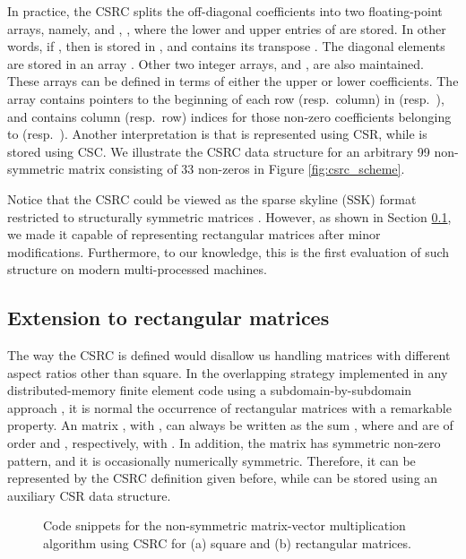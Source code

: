 \documentclass[11pt]{article}
\begin{document}
In practice, the CSRC splits the off-diagonal coefficients into two
floating-point arrays, namely,  and , ,
where the lower and upper entries of  are stored.  In other words, if , then  is stored in , and  contains its transpose .
The diagonal elements are stored in an array .  Other two integer
arrays,  and , are also maintained. These arrays can be defined
in terms of either the upper or lower coefficients.  The  array
contains pointers to the beginning of each row (resp.~column) in 
(resp.~), and  contains column (resp.~row) indices for those non-zero
coefficients belonging to  (resp.~).  Another
interpretation is that  is represented using CSR, while  is stored using
CSC.  We illustrate the CSRC data structure for an arbitrary 99 non-symmetric matrix
consisting of 33 non-zeros in Figure \ref{fig:csrc_scheme}.

Notice that the CSRC could be viewed as the sparse skyline (SSK) format
restricted to structurally symmetric matrices \cite{Saa95a,GR01a}.
However, as shown in Section \ref{sec:rectextension}, we made it capable of
representing rectangular matrices after minor modifications.  Furthermore, to
our knowledge, this is the first evaluation of such structure on modern
multi-processed machines.

\subsection{Extension to rectangular matrices}
\label{sec:rectextension}

The way the CSRC is defined would disallow us handling matrices with different
aspect ratios other than square.  In the overlapping strategy
implemented in any distributed-memory finite element code using a 
subdomain-by-subdomain approach
\cite{RF07a,ARM09a}, it is normal the
occurrence of rectangular matrices with a remarkable property.
An  matrix ,
with , can always be written as the sum , where
 and  are of order  and , respectively, with
.  In addition, the  matrix has symmetric non-zero pattern, and
it is occasionally numerically symmetric.  Therefore, it can be represented by the
CSRC definition given before, while  can be stored using an auxiliary CSR
data structure.

\begin{figure}[!t]
\centering
\subfloat[]{\label{fig:matvec_csrc}}
\hfil
\subfloat[]{\label{fig:matvec_csrcr}}
\caption{Code snippets for the non-symmetric matrix-vector multiplication
algorithm using CSRC for (a) square and
(b) rectangular matrices.}
\label{fig:SpMV}
\end{figure}
\end{document}
